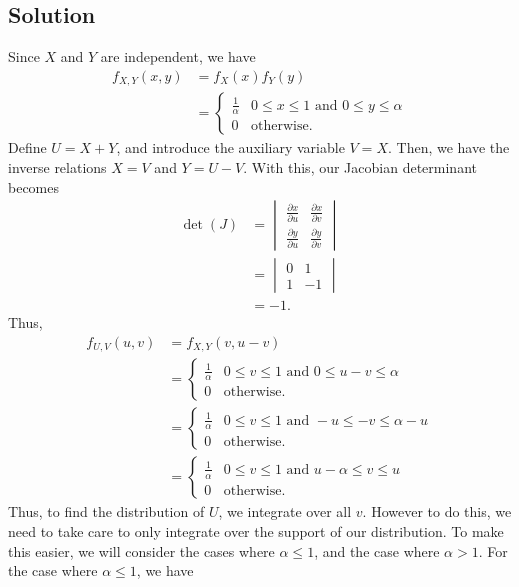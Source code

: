 \documentclass[10pt,a4paper]{article}
\theoremstyle{theorem}
\theoremstyle{definition}
\begin{document}
\subsection*{Solution}
Since $X$ and $Y$ are independent, we have
\begin{align*}
f_{X, Y}(x, y) &= f_X(x) f_Y(y)\\
&= \begin{cases} 
      \frac{1}{\alpha} & 0 \leq x \leq 1 \text{ and } 0 \leq y \leq \alpha \\
      0 & \text{otherwise.}
   \end{cases}
\end{align*}
Define $U = X + Y$, and introduce the auxiliary variable $V = X$. Then, we have the inverse relations $X = V$ and $Y = U - V$. With this, our Jacobian determinant becomes
\begin{align*}
\det(J) &= 
\begin{vmatrix}
\frac{\partial x}{\partial u} & \frac{\partial x}{\partial v}\\
\frac{\partial y}{\partial u} & \frac{\partial y}{\partial v}
\end{vmatrix}\\
&= \begin{vmatrix}
0 & 1\\
1 & -1
\end{vmatrix}\\
&= -1.
\end{align*}
Thus, 
\begin{align*}
f_{U, V}(u, v) &= f_{X, Y}(v, u - v)\\
&= \begin{cases} 
      \frac{1}{\alpha} & 0 \leq v \leq 1 \text{ and } 0 \leq u - v \leq \alpha \\
      0 & \text{otherwise.}
   \end{cases}\\
   &= \begin{cases} 
      \frac{1}{\alpha} & 0 \leq v \leq 1 \text{ and } -u \leq -v \leq \alpha - u \\
      0 & \text{otherwise.}
   \end{cases}\\
   &= \begin{cases} 
      \frac{1}{\alpha} & 0 \leq v \leq 1 \text{ and } u - \alpha \leq v \leq u \\
      0 & \text{otherwise.}
   \end{cases}
\end{align*}
Thus, to find the distribution of $U$, we integrate over all $v$. However to do this, we need to take care to only integrate over the support of our distribution. To make this easier, we will consider the cases where $\alpha \leq 1$, and the case where $\alpha > 1$.  For the case where $\alpha \leq 1$, we have
\end{document}
